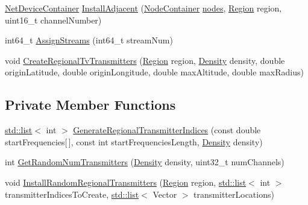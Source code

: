 \begin{DoxyCompactItemize}
\item 
\hyperlink{classns3_1_1NetDeviceContainer}{Net\+Device\+Container} \hyperlink{classns3_1_1TvSpectrumTransmitterHelper_a3aa6caa4e59b922acc30926b8900f860}{Install\+Adjacent} (\hyperlink{classns3_1_1NodeContainer}{Node\+Container} \hyperlink{visualizer-ideas_8txt_a3e1b3808014a2c68ab0cd0182e041be2}{nodes}, \hyperlink{classns3_1_1TvSpectrumTransmitterHelper_a7b4aafcd25156458e9ec922587169bbe}{Region} region, uint16\+\_\+t channel\+Number)
\item 
int64\+\_\+t \hyperlink{classns3_1_1TvSpectrumTransmitterHelper_ae862f97e3cec251b391b2ec27b2e9bf3}{Assign\+Streams} (int64\+\_\+t stream\+Num)
\item 
void \hyperlink{classns3_1_1TvSpectrumTransmitterHelper_aebb24cb396c43e4f0355c04b2506bb35}{Create\+Regional\+Tv\+Transmitters} (\hyperlink{classns3_1_1TvSpectrumTransmitterHelper_a7b4aafcd25156458e9ec922587169bbe}{Region} region, \hyperlink{classns3_1_1TvSpectrumTransmitterHelper_a71a2f35d9d4b50ea4840a18bfba6dba7}{Density} density, double origin\+Latitude, double origin\+Longitude, double max\+Altitude, double max\+Radius)
\end{DoxyCompactItemize}
\subsection*{Private Member Functions}
\begin{DoxyCompactItemize}
\item 
\hyperlink{openflow-interface_8h_afd9bcfa176617760671b67580f536fa7}{std\+::list}$<$ int $>$ \hyperlink{classns3_1_1TvSpectrumTransmitterHelper_a006ecf3ca051c904ef507fbe1594b441}{Generate\+Regional\+Transmitter\+Indices} (const double start\+Frequencies\mbox{[}$\,$\mbox{]}, const int start\+Frequencies\+Length, \hyperlink{classns3_1_1TvSpectrumTransmitterHelper_a71a2f35d9d4b50ea4840a18bfba6dba7}{Density} density)
\item 
int \hyperlink{classns3_1_1TvSpectrumTransmitterHelper_a81900fd7fbf95c1a3514b6ae03fedab4}{Get\+Random\+Num\+Transmitters} (\hyperlink{classns3_1_1TvSpectrumTransmitterHelper_a71a2f35d9d4b50ea4840a18bfba6dba7}{Density} density, uint32\+\_\+t num\+Channels)
\item 
void \hyperlink{classns3_1_1TvSpectrumTransmitterHelper_a71ca22142ae69f832fd18adc8d6d5805}{Install\+Random\+Regional\+Transmitters} (\hyperlink{classns3_1_1TvSpectrumTransmitterHelper_a7b4aafcd25156458e9ec922587169bbe}{Region} region, \hyperlink{openflow-interface_8h_afd9bcfa176617760671b67580f536fa7}{std\+::list}$<$ int $>$ transmitter\+Indices\+To\+Create, \hyperlink{openflow-interface_8h_afd9bcfa176617760671b67580f536fa7}{std\+::list}$<$ Vector $>$ transmitter\+Locations)
\end{DoxyCompactItemize}
